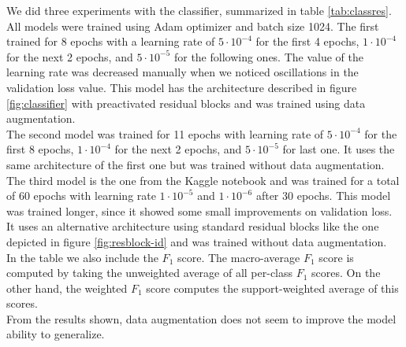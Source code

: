 We did three experiments with the classifier, summarized in table \ref{tab:classres}. All models were trained using Adam optimizer and batch size 1024. The first trained for 8 epochs with a learning rate of $5 \cdot 10^{-4}$ for the first 4 epochs, $1 \cdot 10^{-4}$ for the next 2 epochs, and $5 \cdot 10^{-5}$ for the following ones. The value of the learning rate was decreased manually when we noticed oscillations in the validation loss value. This model has the architecture described in figure \ref{fig:classifier} with preactivated residual blocks and was trained using data augmentation. \\
The second model was trained for 11 epochs with learning rate of $5 \cdot 10^{-4}$ for the first 8 epochs, $1 \cdot 10^{-4}$ for the next 2 epochs, and $5 \cdot 10^{-5}$ for last one. It uses the same architecture of the first one but was trained without data augmentation.
The third model is the one from the Kaggle notebook and was trained for a total of 60 epochs with learning rate $1 \cdot 10^{-5}$ and $1 \cdot 10^{-6}$ after 30 epochs. This model was trained longer, since it showed some small improvements on validation loss. It uses an alternative architecture using standard residual blocks like the one depicted in figure \ref{fig:resblock-id} and was trained without data augmentation.\\
In the table we also include the $F_1$ score. The macro-average $F_1$ score is computed by taking the unweighted average of all per-class $F_1$ scores. On the other hand, the weighted $F_1$ score computes the support-weighted average of this scores.\\
From the results shown, data augmentation does not seem to improve the model ability to generalize.